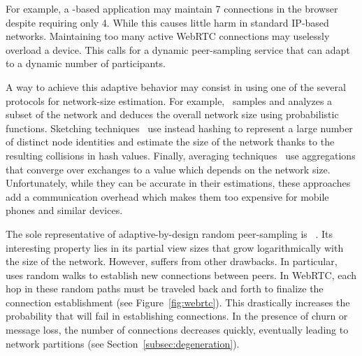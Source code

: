 For example, a \CYCLON-based application may maintain 7 connections in
the browser despite requiring only 4. While this causes little harm in
standard IP-based networks. Maintaining too many active WebRTC
connections may uselessly overload a device. This calls for a dynamic
peer-sampling service that can adapt to a dynamic number of
participants.

A way to achieve this adaptive behavior may consist in using one of the several
protocols for network-size estimation. For example,~\cite{ganesh2007peer}
samples and analyzes a subset of the network and deduces the overall network
size using probabilistic functions.  Sketching
techniques~\cite{baquero2012extrema} use instead hashing to represent a large
number of distinct node identities and estimate the size of the network thanks
to the resulting collisions in hash values. Finally, averaging
techniques~\cite{jelasity2004epidemic} use aggregations that converge over
exchanges to a value which depends on the network size. Unfortunately, while
they can be accurate in their estimations, these approaches add a communication
overhead which makes them too expensive for mobile phones and similar devices.



The sole representative of adaptive-by-design random peer-sampling is
\SCAMP~\cite{ganesh2001scamp,ganesh2003peer}. Its interesting property lies in its
partial view sizes that grow logarithmically with the size of the
network. However, \SCAMP suffers from other drawbacks.  In particular, \SCAMP
uses random walks to establish new connections between peers. In WebRTC, each
hop in these random paths must be traveled back and forth to finalize the
connection establishment (see Figure~\ref{fig:webrtc}). This drastically
increases the probability that \SCAMP will fail in establishing connections. In
the presence of churn or message loss, the number of connections decreases
quickly, eventually leading to network partitions (see
Section~\ref{subsec:degeneration}).


